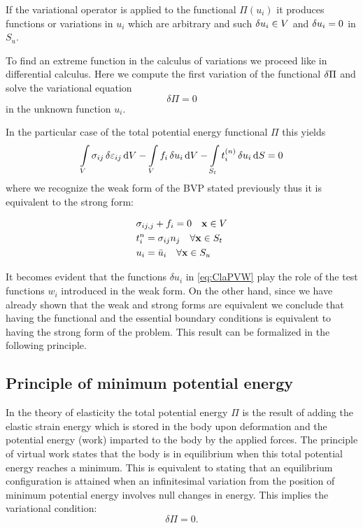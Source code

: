 If the variational operator is applied to the functional $\Pi(u_i)$ it produces functions or variations in $u_i$ which are arbitrary and such $\var{u_i} \in V$ and $\var{u_i} = 0$ in $S_u$.

To find an extreme function in the calculus of variations we proceed like in differential calculus. Here we compute the first variation of the functional $\var{\Pi}$ and solve the variational equation
\begin{equation}\label{eq:vareq}
    \delta \Pi  = 0
\end{equation}
in the unknown function $u_i$. 

In the particular case of the total potential energy functional $\Pi$ this yields
\begin{equation}\label{eq:ClaPVW}
    \int\limits_V \sigma _{ij}\var{\varepsilon_{ij}}\dd{V}  - \int\limits_V f_i \var{u_i} \dd{V}  - \int\limits_{S_t} t_i^{(n)} \var{u_i}\dd{S}  = 0
\end{equation}
where we recognize the weak form of the BVP stated previously thus it is equivalent to the strong form:

\begin{equation} 
\begin{split}
&\sigma_{ij,j} + f_i = 0 \quad \vb{x} \in V \\
&t_i^n = \sigma_{ij} n_j \quad \forall \vb{x} \in S_t\\
&{u_i} = \bar{u}_i \quad \forall \vb{x} \in S_u
\end{split}
\label{equil_223}
\end{equation}

It becomes evident that the functions $\delta {u_i}$ in \cref{eq:ClaPVW} play the role of the test functions $w_i$ introduced in the weak form. On the other hand, since we have already shown that the weak and strong forms are equivalent we conclude that having the functional and the essential boundary conditions is equivalent to having the strong form of the problem. This result can be formalized in the following principle.


\subsection{Principle of minimum potential energy}
In the theory of elasticity the total potential energy $\Pi$ is the result of adding the elastic strain energy which is stored in the body upon deformation and the potential energy (work) imparted to the body by the applied forces. The principle of virtual work states that the body is in equilibrium when this total potential energy reaches a minimum. This is equivalent to stating that an equilibrium configuration is attained when an infinitesimal variation from the position of minimum potential energy involves null changes in energy. This implies the variational condition:
\begin{equation}\label{vareq2}
    \delta \Pi  = 0.
\end{equation}

